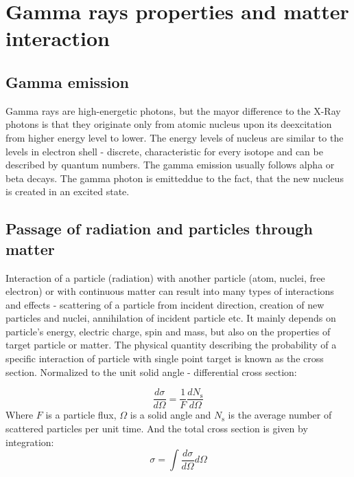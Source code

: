
\chapter{Gamma rays properties and matter interaction}


\section{Gamma emission}
Gamma rays are high-energetic photons, but the mayor difference to the X-Ray photons is that they originate only from atomic nucleus upon its deexcitation from higher energy level to lower. The energy levels of nucleus are similar to the levels in electron shell - discrete, characteristic for every isotope and can be described by quantum numbers. The gamma emission usually follows alpha or beta decays. The gamma photon is emitteddue to the fact, that the new nucleus is created in an excited state.


\section{Passage of radiation and particles through matter}
Interaction of a particle (radiation) with another particle (atom, nuclei, free electron) or with continuous matter can result into many types of interactions and effects - scattering of a particle from incident direction, creation of new particles and nuclei, annihilation of incident particle etc. It mainly depends on particle's energy, electric charge, spin and mass, but also on the properties of target particle or matter. The physical quantity describing the probability of a specific interaction of particle with single point target is known as the cross section. Normalized to the unit solid angle - differential cross section:



 \begin{equation}
\frac{d\sigma}{d\Omega} = \frac{1}{F} \frac{dN_\textrm{s}}{d\Omega}
 \end{equation}
Where $F$ is a particle flux, $\Omega$ is a solid angle and $N_\textrm{s}$ is the average number of scattered particles per unit time.
And the total cross section is given by integration:
  \begin{equation}
 \sigma = \int \frac{d\sigma}{d\Omega} d\Omega
 \end{equation}

